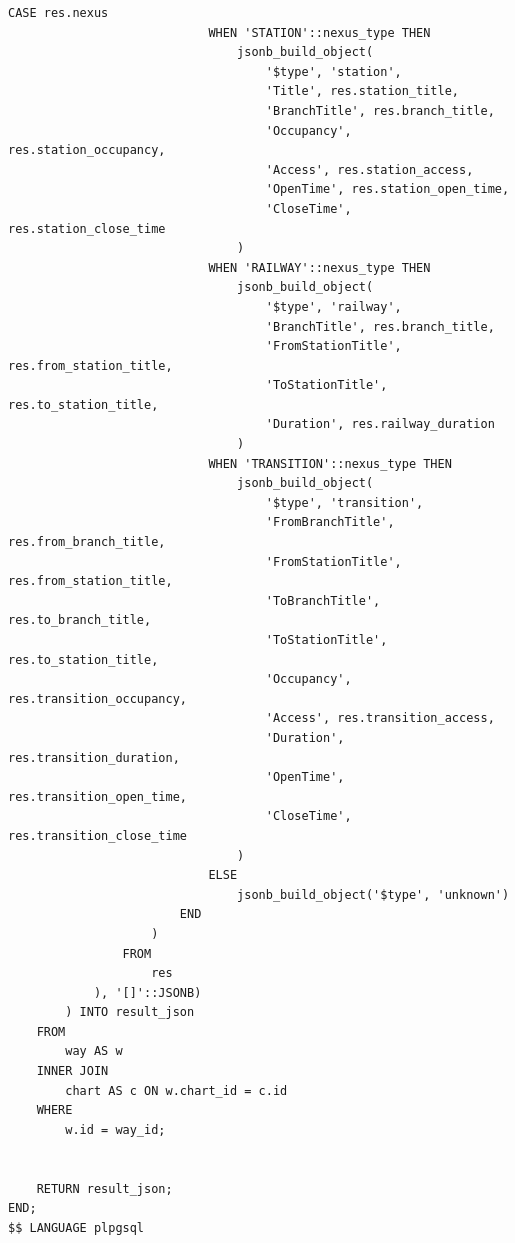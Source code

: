 \clearpage

\begin{lstlisting}[label=lst:get_route_json_by_id:5,caption=Реализация функции получения маршрута (часть 5),firstnumber=202]
                        CASE res.nexus
                            WHEN 'STATION'::nexus_type THEN
                                jsonb_build_object(
                                    '$type', 'station',
                                    'Title', res.station_title,
                                    'BranchTitle', res.branch_title,
                                    'Occupancy', res.station_occupancy,
                                    'Access', res.station_access,
                                    'OpenTime', res.station_open_time,
                                    'CloseTime', res.station_close_time
                                )
                            WHEN 'RAILWAY'::nexus_type THEN
                                jsonb_build_object(
                                    '$type', 'railway',
                                    'BranchTitle', res.branch_title,
                                    'FromStationTitle', res.from_station_title,
                                    'ToStationTitle', res.to_station_title,
                                    'Duration', res.railway_duration
                                )
                            WHEN 'TRANSITION'::nexus_type THEN
                                jsonb_build_object(
                                    '$type', 'transition',
                                    'FromBranchTitle', res.from_branch_title,
                                    'FromStationTitle', res.from_station_title,
                                    'ToBranchTitle', res.to_branch_title,
                                    'ToStationTitle', res.to_station_title,
                                    'Occupancy', res.transition_occupancy,
                                    'Access', res.transition_access,
                                    'Duration', res.transition_duration,
                                    'OpenTime', res.transition_open_time,
                                    'CloseTime', res.transition_close_time
                                )
                            ELSE
                                jsonb_build_object('$type', 'unknown')
                        END
                    )
                FROM
                    res
            ), '[]'::JSONB)
        ) INTO result_json
    FROM
        way AS w
    INNER JOIN
        chart AS c ON w.chart_id = c.id
    WHERE
        w.id = way_id;


    RETURN result_json;
END;
$$ LANGUAGE plpgsql
\end{lstlisting}


